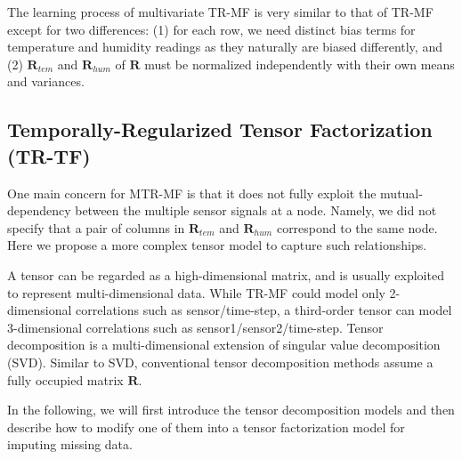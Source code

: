 The learning process of multivariate TR-MF is very similar to that of TR-MF except for two differences:
(1) for each row, we need distinct bias terms for temperature and humidity readings as they naturally are biased differently, and (2) $\mathbf{R}_{tem}$ and $\mathbf{R}_{hum}$ of $\mathbf{R}$ must be normalized independently with their own means and variances. 

 
\subsection{Temporally-Regularized Tensor Factorization (TR-TF)} \label{sec:tensordecomp}

One main concern for MTR-MF is that it does not fully exploit the mutual-dependency between the 
multiple sensor signals at a node. Namely, we did not specify that a pair of columns in 
$\mathbf{R}_{tem}$ and $\mathbf{R}_{hum}$ correspond to the same node. Here we propose a more 
complex tensor model to capture such relationships.

A tensor can be regarded as a high-dimensional matrix, and is usually exploited to represent 
multi-dimensional data.  While TR-MF could model only 2-dimensional correlations such as
sensor/time-step, a third-order tensor can model 3-dimensional correlations
such as sen\-sor1/sensor2/time-step.
%
Tensor decomposition is a multi-dimensional extension of singular value decomposition (SVD). Similar to SVD, conventional tensor decomposition methods assume a fully occupied matrix $\mathbf{R}$.

In the following, we will first introduce the tensor decomposition models and then describe how to modify one of them into a tensor factorization model for imputing missing data.

 
